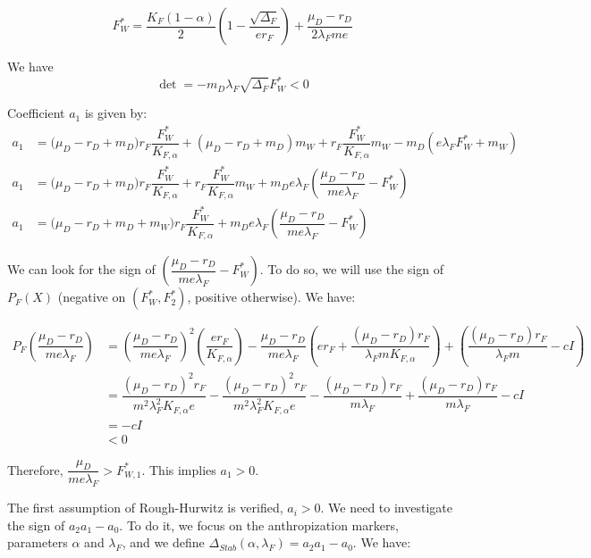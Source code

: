 \documentclass{article}
\newcommand{\lfw}{\lambda_{F}}
\newcommand{\lfw}{\lambda_{F}}
\begin{document}
\begin{equation*}
F_W^* = \dfrac{K_F(1-\alpha)}{2}\left(1 - \dfrac{\sqrt{\Delta_F}}{er_F}\right) + \dfrac{\mu_D - r_D}{2\lfw m e}
\end{equation*}

We have 
\begin{equation*}
\det = - m_D \lfw \sqrt{\Delta_F}  F^*_{W} < 0
\end{equation*}

Coefficient $a_1$ is given by:
\begin{align*}
a_1 &= \big( \mu_D  -r_D + m_D) r_F \dfrac{F^*_W}{K_{F, \alpha}} + (\mu_D -r_D + m_D) m_W + r_F \dfrac{F_W^*}{K_{F, \alpha}} m_W - m_D (e\lfw F^*_W + m_W) \\
a_1 &= \big( \mu_D -r_D + m_D) r_F \dfrac{F^*_W}{K_{F, \alpha}}  + r_F \dfrac{F_W^*}{K_{F, \alpha}} m_W + m_D e\lfw   \left(\dfrac{\mu_D - r_D}{m e\lfw} - F^*_W \right)  \\
a_1 &= \big( \mu_D -r_D + m_D + m_W) r_F \dfrac{F^*_W}{K_{F, \alpha}}   + m_D e\lfw   \left(\dfrac{\mu_D - r_D}{m e\lfw} - F^*_W \right)
\end{align*}

We can look for the sign of $\left(\dfrac{\mu_D -r_D}{m e\lfw} - F^*_{W}\right)$. To do so, we will use the sign of $P_F(X)$ (negative on $(F^*_W, F^*_2)$, positive otherwise). We have:

\begin{align*}
P_F \left(\dfrac{\mu_D-r_D}{m e\lfw}\right) &= \left(\dfrac{\mu_D-r_D}{m e\lfw} \right)^2 \left(\dfrac{er_F}{K_{F, \alpha}} \right) - \dfrac{\mu_D-r_D}{m e\lfw} \left(er_F + \dfrac{(\mu_D -r_D) r_F}{\lfw m K_{F, \alpha}} \right) + \left(\dfrac{(\mu_D-r_D) r_F}{\lfw m} - cI\right) \\
&= \dfrac{(\mu_D-r_D)^2 r_F}{m^2 \lfw^2 K_{F, \alpha} e} - \dfrac{(\mu_D-r_D)^2 r_F}{m^2 \lfw^2 K_{F, \alpha} e} - \dfrac{(\mu_D-r_D) r_F}{m \lfw} + \dfrac{(\mu_D-r_D) r_F}{m \lfw} - cI \\
&= - cI\\
& < 0
\end{align*}

Therefore, $\dfrac{\mu_D}{m e\lfw} > F^*_{W, 1}$. This implies $a_1 > 0$.

The first assumption of Rough-Hurwitz is verified, $a_i > 0$. We need to investigate the sign of $a_2 a_1 - a_0$. To do it, we focus on the anthropization markers, parameters $\alpha$ and $\lfw$, and we define $\Delta_{Stab}(\alpha, \lfw) = a_2 a_1 - a_0$. We have:
\end{document}
